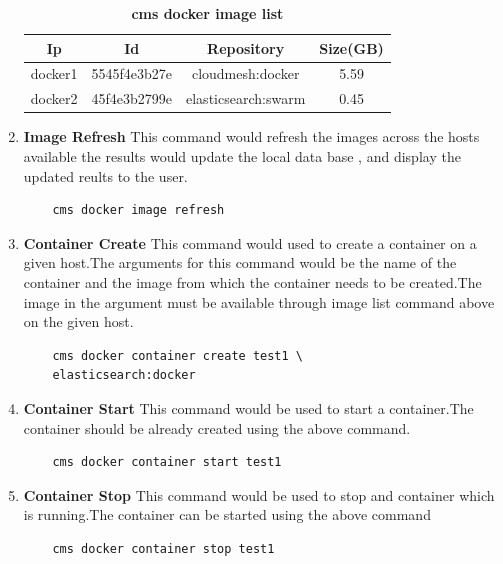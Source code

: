 \documentclass[9pt,twocolumn,twoside]{../../styles/osajnl}
\begin{document}
\begin{enumerate}
    \begin{table}[h!]
     \caption{\bf cms docker image list }
     \begin{tabular}{cccc}
     \hline
      Ip & Id & Repository & Size(GB)\\
      \hline
      docker1 & 5545f4e3b27e & cloudmesh:docker & 5.59 \\
      docker2 & 45f4e3b2799e & elasticsearch:swarm & 0.45 \\
     \hline
     \end{tabular}
     \label{tab:tab2}
     \end{table}
     
    \item \textbf{Image Refresh} 
     This command would refresh the images across the hosts available the results would update the local data base , and display the updated reults to the user.
    \begin{verbatim}
    cms docker image refresh
    \end{verbatim}

    \item \textbf{Container Create}
     This command would used to create a container on a given host.The arguments for this command would be the name of the container and the image from which the container needs to be created.The image in the argument must be available through image list command above on the given host.\\
 
    \begin{verbatim}
    cms docker container create test1 \
    elasticsearch:docker
    \end{verbatim}
    
    \item \textbf{Container Start}
     This command would be used to start a container.The container should be already created using the above command.\\

    \begin{verbatim}
    cms docker container start test1
    \end{verbatim}     
     
    \item \textbf{Container Stop}
     This command would be used to stop and container which is running.The container can be started using the above command\\

    \begin{verbatim}
    cms docker container stop test1
    \end{verbatim}  
    

\end{enumerate}
\end{document}
